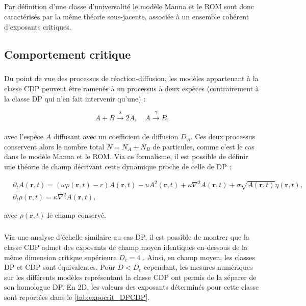 \subparagraph{}Par définition d'une classe d'universalité le modèle Manna et le ROM sont donc caractérisés par la même théorie sous-jacente, associée à un ensemble cohérent d'exposants critiques.

\subsection{Comportement critique}

\label{sec:CompCDP}

\subparagraph{}Du point de vue des processus de réaction-diffusion, les modèles appartenant à la classe CDP peuvent être ramenés à un processus à deux espèces \cite{van_wijland_wilson_1998, pastor_satorras_reaction_diffusion_2001, pastor_satorras_field_2000} (contrairement à la classe DP qui n'en fait intervenir qu'une) :

\begin{equation}
	A +B \xrightarrow[]{\lambda} 2A, \quad A \xrightarrow[]{\gamma} B,
\end{equation}

\noindent avec l'espèce $A$ diffusant avec un coefficient de diffusion $D_A$. Ces deux processus conservent alors le nombre total $N=N_A+N_B$ de particules, comme c'est le cas dans le modèle Manna et le ROM. Via ce formalisme, il est possible de définir une théorie de champ décrivant cette dynamique proche de celle de DP \cite{van_wijland_universality_2002, le_doussal_exact_2015} :

\begin{equation}
\begin{aligned}
	&\partial_t A(\mathbf{r}, t) = (\omega\rho (\mathbf{r}, t) - r)A(\mathbf{r}, t) - uA^2(\mathbf{r}, t) + \kappa\nabla^2 A (\mathbf{r}, t) + \sigma \sqrt{A(\mathbf{r}, t)} \eta(\mathbf{r}, t),\\
	&\partial_t \rho (\mathbf{r}, t) = \kappa\nabla^2 A (\mathbf{r}, t),
\end{aligned}
\label{eq:CDP}
\end{equation}

\noindent avec $\rho(\mathbf{r}, t)$ le champ conservé.

\subparagraph{}Via une analyse d'échelle similaire au cas DP, il est possible de montrer que la classe CDP admet des exposants de champ moyen identiques en-dessous de la même dimension critique supérieure $D_c = 4$ \cite{le_doussal_exact_2015, lubeck_universal_2004}. Ainsi, en champ moyen, les classes DP et CDP sont équivalentes. Pour $D<D_c$ cependant, les mesures numériques sur les différents modèles représentant la classe CDP ont permis de la séparer de son homologue DP. En 2D, les valeurs des exposants déterminés pour cette classe sont reportées dans le \autoref{tab:expocrit_DPCDP}.

